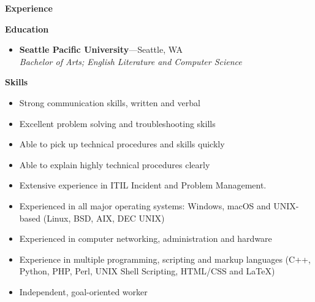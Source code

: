 \documentclass[10pt,oneside]{article}
\newenvironment{ressection}[1]{
    \vspace{4pt}
    {\Large\textbf{#1}}
    \begin{itemize}
    \vspace{3pt}
}{
    \end{itemize}
}
\newcommand{\resitem}[1]{
    \vspace{-4pt}
    \item \begin{flushleft} #1 \end{flushleft}
}
\newcommand{\ressubitem}[1]{
    \vspace{-2pt}
    \item \begin{flushleft} #1 \end{flushleft}
}
\newcommand{\resbigitem}[3]{
    \vspace{-5pt}
    \item
    \textbf{#1}---#2 \\
    \textit{#3}
}
\newenvironment{ressubsec}[3]{
    \resbigitem{#1}{#2}{#3}
    \vspace{-1pt}
    \begin{itemize}
}{
    \end{itemize}
}
\begin{document}
\begin{ressection}{Experience}



\end{ressection}

\begin{ressection}{Education}

    \resbigitem{Seattle Pacific University}{Seattle, WA}{Bachelor of Arts; English Literature and Computer Science}

\end{ressection}

\begin{ressection}{Skills}

    \resitem{Strong communication skills, written and verbal}
    \resitem{Excellent problem solving and troubleshooting skills}
    \resitem{Able to pick up technical procedures and skills quickly}
    \resitem{Able to explain highly technical procedures clearly}
    \resitem{Extensive experience in ITIL Incident and Problem Management.}
    \resitem{Experienced in all major operating systems: Windows, macOS and UNIX-based (Linux, BSD, AIX, DEC UNIX)}
    \resitem{Experienced in computer networking, administration and hardware}
    \resitem{Experience in multiple programming, scripting and markup languages (C++, Python, PHP, Perl, UNIX Shell Scripting, HTML/CSS and \LaTeX)}
    \resitem{Independent, goal-oriented worker}

\end{ressection}
\end{document}

